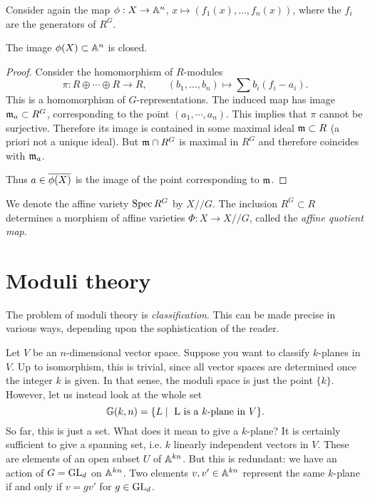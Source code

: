 \documentclass[11pt, english]{article}
\begin{document}
Consider again the map $\phi:X \to \mathbb{A}^n$, $x \mapsto (f_1(x),\ldots,f_n(x))$, where the $f_i$ are the generators of $R^G$. 

\begin{prop}
The image $\phi(X) \subset \mathbb{A}^n$ is closed.
\end{prop}
\begin{proof}
 Consider the homomorphism of $R$-modules
\[
\pi: R \oplus \cdots \oplus R \to R, \qquad (b_1,\ldots,b_n) \mapsto \sum b_i(f_i-a_i).
\]
This is a homomorphism of $G$-representations. The induced map has image $\mathfrak{m}_a \subset R^G$, corresponding to the point $(a_1,\cdots, a_n)$. This implies that $\pi$ cannot be surjective. Therefore its image is contained in some maximal ideal $\mathfrak{m} \subset R$ (a priori not a unique ideal). But $\mathfrak{m}\cap R^G$ is maximal in $R^G$ and therefore coincides with $\mathfrak{m}_a$. 

Thus $a \in \overline{\phi(X)}$ is the image of the point corresponding to $\mathfrak{m}$.
\end{proof}

\begin{defi}
 We denote the affine variety $\operatorname{Spec} R^G$ by $X/\!/G$. The inclusion $R^G \subset R$ determines a morphism of affine varieties $\Phi:X \to X /\!/ G$, called the \emph{affine quotient map}.
\end{defi}

\section{Moduli theory}

The problem of moduli theory is \emph{classification}. This can be made precise in various ways, depending upon the sophistication of the reader.

Let $V$ be an $n$-dimensional vector space. Suppose you want to classify $k$-planes in $V$. Up to isomorphism, this is trivial, since all vector spaces are determined once the integer $k$ is given. In that sense, the moduli space is just the point $\{k \}$. However, let us instead look at the whole set
$$ \mathbb{G}(k,n) = \{ L \mid \text{ L is a $k$-plane in $V$} \}.$$
So far, this is just a set. What does it mean to give a $k$-plane? It is certainly sufficient to give a spanning set, i.e. $k$ linearly independent vectors in $V$. These are elements of an open subset $U$ of $\mathbb{A}^{kn}$. But this is redundant: we have an action of $G=\operatorname{GL}_d$ on $\mathbb{A}^{kn}$. Two elements $v,v' \in \mathbb{A}^{kn}$  represent the same $k$-plane if and only if $v =gv'$ for $g \in \operatorname{GL}_d$.
\end{document}
